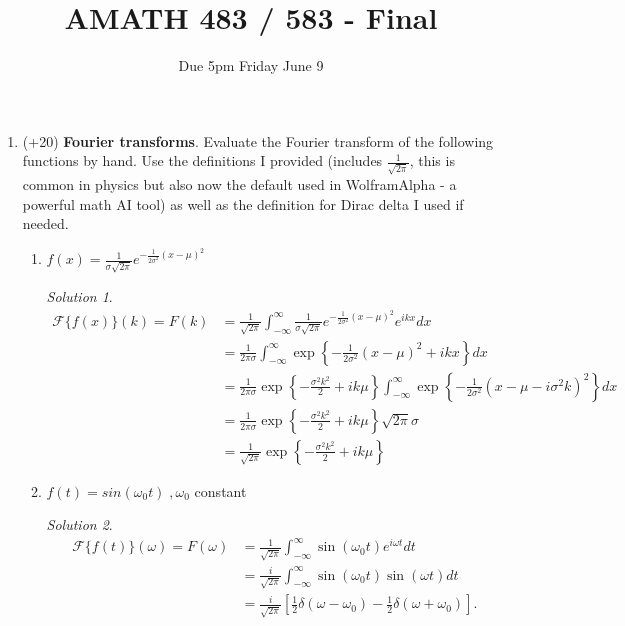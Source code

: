 \documentclass[10pt]{article}
\theoremstyle{definition}
\theoremstyle{remark}
\newtheorem*{solution}{Solution}
\begin{document}
\title{AMATH 483 / 583 - Final}
\author{Due 5pm Friday June 9}
\maketitle

\begin{enumerate}

    \item (+20) \textbf{Fourier transforms}. Evaluate the Fourier transform of the following functions by hand. Use the definitions I provided (includes $\frac{1}{\sqrt{2\pi}}$, this is common in physics but also now the default used in WolframAlpha - a powerful math AI tool) as well as the definition for Dirac delta I used if needed.   
    \begin{enumerate}[label=\alph*.]
        \item $f(x) = \frac{1}{\sigma\sqrt{2\pi}} e^{-\frac{1}{2\sigma^2}(x-\mu)^2}$
        \begin{solution}
            \begin{align*}
                \mathcal F\{f(x)\}(k) = F(k) &= \frac{1}{\sqrt{2\pi}} \int_{-\infty}^\infty \frac{1}{\sigma\sqrt{2\pi}} e^{-\frac{1}{2\sigma^2}(x-\mu)^2} e^{i k x} dx \\
                &= \frac{1}{2 \pi \sigma} \int_{-\infty}^\infty \exp\left\{-\frac{1}{2\sigma^2} (x-\mu)^2 + ikx\right\} dx \\
                &= \frac{1}{2\pi \sigma} \exp\left\{ - \frac{\sigma^2k^2}{2} + i k\mu \right\}\int_{-\infty}^\infty \exp\left\{ -\frac{1}{2\sigma^2}(x-\mu-i\sigma^2 k)^2 \right\}dx \\
                &= \frac{1}{2\pi \sigma} \exp\left\{ - \frac{\sigma^2k^2}{2} + i k\mu \right\} \sqrt{2\pi} \sigma \\
                &= \frac{1}{\sqrt{2\pi}}\exp\left\{ - \frac{\sigma^2k^2}{2} + i k\mu \right\}
            \end{align*}
        \end{solution}

        \item $f(t) = sin (\omega_{0} t) \; ,\omega_{0}$ constant
        \begin{solution}
            \begin{align*}
                \mathcal F\{f(t)\}(\omega) = F(\omega) &= \frac{1}{\sqrt{2\pi}} \int_{-\infty}^\infty \sin(\omega_0 t) e^{i \omega t} dt \\
                &= \frac{i}{\sqrt{2\pi}} \int_{-\infty}^\infty \sin(\omega_0 t) \sin(\omega t) dt \\
                &= \frac{i}{\sqrt{2\pi}} \left[ \frac{1}{2} \delta(\omega - \omega_0) - \frac{1}{2} \delta(\omega + \omega_0) \right].
            \end{align*}
        \end{solution}


\end{enumerate}
\end{enumerate}
\end{document}
